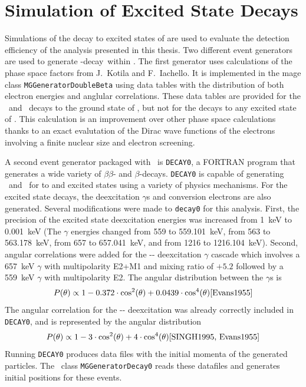 \documentclass[/main.tex]{subfiles}
\begin{document}
\section{Simulation of Excited State Decays} \label{sec:essims}
Simulations of the  decay to excited states of  are used to evaluate the detection efficiency of the analysis presented in this thesis.
Two different event generators are used to generate  \bb-decay\ within \Mage.
The first generator uses calculations of the phase space factors from J.~Kotila and F.~Iachello\cite{Kotila2012}.
It is implemented in the mage class \texttt{MGGeneratorDoubleBeta} using data tables with the distribution of both electron energies and anglular correlations.
These data tables are provided for the \tnbb\ and \znbb\ decays to the ground state of , but not for the decays to any excited state of .
This calculation is an improvement over other phase space calculations thanks to an exact evalutation of the Dirac wave functions of the electrons involving a finite nuclear size and electron screening.

A second event generator packaged with \Mage\ is \texttt{DECAY0}\cite{Ponkratenko2000}, a FORTRAN program that generates a wide variety of $\beta\beta$- and $\beta$-decays.
\texttt{DECAY0} is capable of generating \tnbb\ and \znbb\ for  to   and  excited states using a variety of physics mechanisms.
For the excited state decays, the deexcitation $\gamma$s and conversion electrons are also generated.
Several modifications were made to \texttt{decay0} for this analysis.
First, the precision of the excited state deexcitation energies was increased from 1~keV to 0.001~keV (The $\gamma$ energies changed from 559 to 559.101~keV, from 563 to 563.178~keV, from 657 to 657.041~keV, and from 1216 to 1216.104~keV).
Second, angular correlations were added for the -- deexcitation $\gamma$ cascade which involves a 657~keV $\gamma$ with multipolarity E2+M1 and mixing ratio of $+5.2$ followed by a 559~keV $\gamma$ with multipolarity E2\cite{SINGH1995}.
The angular distribution between the $\gamma$s is
\begin{equation}
  P(\theta)\propto 1-0.372\cdot\cos^2(\theta)+0.0439\cdot\cos^4(\theta)\cite{Evans1955}
\end{equation}
The angular correlation for the -- deexcitation was already correctly included in \texttt{DECAY0}, and is represented by the angular distribution
\begin{equation}
  P(\theta)\propto 1-3\cdot\cos^2(\theta)+4\cdot\cos^4(\theta)\cite{SINGH1995, Evans1955}
\end{equation}
Running \texttt{DECAY0} produces data files with the initial momenta of the generated particles.
The \Mage\ class \texttt{MGGeneratorDecay0} reads these datafiles and generates initial positions for these events.
\end{document}
